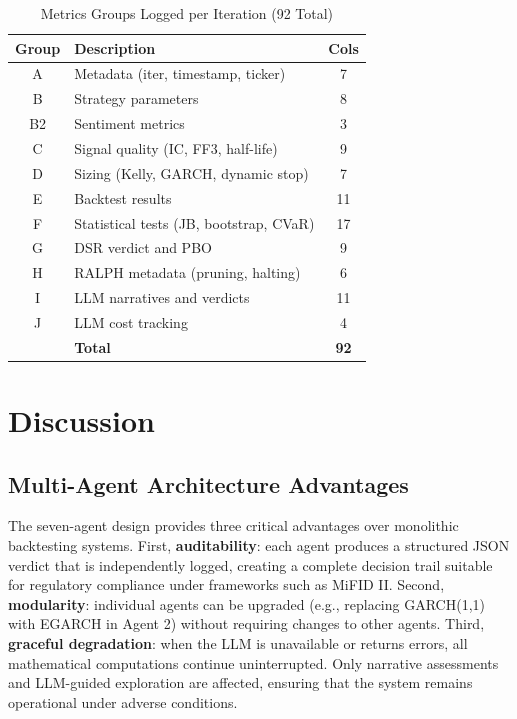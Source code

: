 \documentclass[conference]{IEEEtran}
\begin{document}
\begin{table}[h!]
\centering
\caption{Metrics Groups Logged per Iteration (92 Total)}
\label{tab:metrics}
\begin{tabular}{@{}clc@{}}
\toprule
\textbf{Group} & \textbf{Description} & \textbf{Cols} \\
\midrule
A & Metadata (iter, timestamp, ticker) & 7 \\
B & Strategy parameters & 8 \\
B2 & Sentiment metrics & 3 \\
C & Signal quality (IC, FF3, half-life) & 9 \\
D & Sizing (Kelly, GARCH, dynamic stop) & 7 \\
E & Backtest results & 11 \\
F & Statistical tests (JB, bootstrap, CVaR) & 17 \\
G & DSR verdict and PBO & 9 \\
H & RALPH metadata (pruning, halting) & 6 \\
I & LLM narratives and verdicts & 11 \\
J & LLM cost tracking & 4 \\
\midrule
& \textbf{Total} & \textbf{92} \\
\bottomrule
\end{tabular}
\end{table}

\section{Discussion}
\label{sec:discussion}

\subsection{Multi-Agent Architecture Advantages}

The seven-agent design provides three critical advantages over monolithic backtesting systems. First, \textbf{auditability}: each agent produces a structured JSON verdict that is independently logged, creating a complete decision trail suitable for regulatory compliance under frameworks such as MiFID II. Second, \textbf{modularity}: individual agents can be upgraded (e.g., replacing GARCH(1,1) with EGARCH in Agent 2) without requiring changes to other agents. Third, \textbf{graceful degradation}: when the LLM is unavailable or returns errors, all mathematical computations continue uninterrupted. Only narrative assessments and LLM-guided exploration are affected, ensuring that the system remains operational under adverse conditions.
\end{document}
